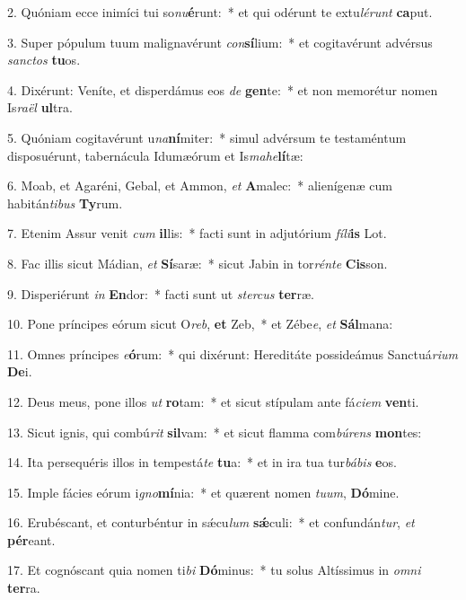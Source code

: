 2. Quóniam ecce inimíci tui so\textit{nu}\textbf{é}runt:~*  et qui odérunt te extu\textit{lé}\textit{runt} \textbf{ca}put.\

3. Super pópulum tuum malignavérunt \textit{con}\textbf{sí}lium:~*  et cogitavérunt advérsus \textit{sanc}\textit{tos} \textbf{tu}os.\

4. Dixérunt: Veníte, et disperdámus eos \textit{de} \textbf{gen}te:~*  et non memorétur nomen Is\textit{ra}\textit{ël} \textbf{ul}tra.\

5. Quóniam cogitavérunt u\textit{na}\textbf{ní}miter:~*  simul advérsum te testaméntum disposuérunt, tabernácula Idumæórum et Is\textit{ma}\textit{he}\textbf{lí}tæ:\

6. Moab, et Agaréni, Gebal, et Ammon, \textit{et} \textbf{A}malec:~*  alienígenæ cum habitán\textit{ti}\textit{bus} \textbf{Ty}rum.\

7. Etenim Assur venit \textit{cum} \textbf{il}lis:~*  facti sunt in adjutórium \textit{fí}\textit{li}\textbf{is} Lot.\

8. Fac illis sicut Mádian, \textit{et} \textbf{Sí}saræ:~*  sicut Jabin in tor\textit{rén}\textit{te} \textbf{Cis}son.\

9. Disperiérunt \textit{in} \textbf{En}dor:~*  facti sunt ut \textit{ster}\textit{cus} \textbf{ter}ræ.\

10. Pone príncipes eórum sicut O\textit{reb}, \textbf{et} Zeb,~*  et Zébe\textit{e}, \textit{et} \textbf{Sál}mana:\

11. Omnes príncipes \textit{e}\textbf{ó}rum:~*  qui dixérunt: Hereditáte possideámus Sanctuá\textit{ri}\textit{um} \textbf{De}i.\

12. Deus meus, pone illos \textit{ut} \textbf{ro}tam:~*  et sicut stípulam ante fá\textit{ci}\textit{em} \textbf{ven}ti.\

13. Sicut ignis, qui combú\textit{rit} \textbf{sil}vam:~*  et sicut flamma com\textit{bú}\textit{rens} \textbf{mon}tes:\

14. Ita persequéris illos in tempestá\textit{te} \textbf{tu}a:~*  et in ira tua tur\textit{bá}\textit{bis} \textbf{e}os.\

15. Imple fácies eórum i\textit{gno}\textbf{mí}nia:~*  et quærent nomen \textit{tu}\textit{um}, \textbf{Dó}mine.\

16. Erubéscant, et conturbéntur in sǽcu\textit{lum} \textbf{sǽ}culi:~*  et confundán\textit{tur}, \textit{et} \textbf{pér}eant.\

17. Et cognóscant quia nomen ti\textit{bi} \textbf{Dó}minus:~*  tu solus Altíssimus in \textit{om}\textit{ni} \textbf{ter}ra.\

